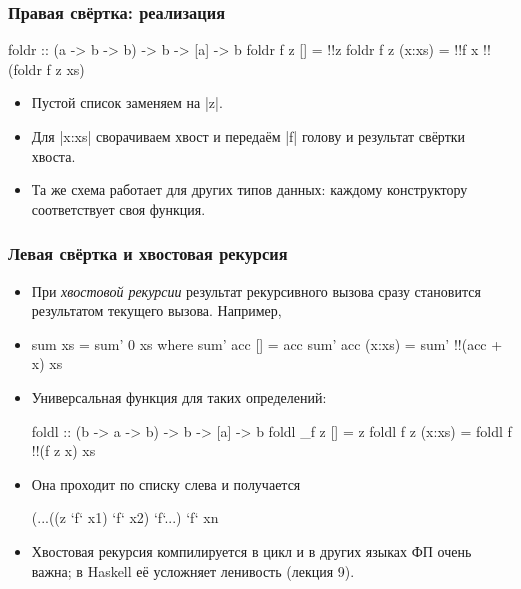\documentclass[11pt]{beamer}
\begin{document}
\begin{frame}[fragile]
  \frametitle{Правая свёртка: реализация}
  \begin{haskell}
    foldr :: (a -> b -> b) -> b -> [a] -> b
    foldr f z [] = !\pause!z
    foldr f z (x:xs) = !\pause!f x !\pause!(foldr f z xs)
  \end{haskell}
  \begin{itemize}
    \item Пустой список заменяем на \haskinline|z|.
    \item Для \haskinline|x:xs| сворачиваем хвост и передаём \haskinline|f| голову и результат свёртки хвоста.
    \item Та же схема работает для других типов данных: каждому конструктору соответствует своя функция.
  \end{itemize}
\end{frame}

\begin{frame}[fragile]
  \frametitle{Левая свёртка и хвостовая рекурсия}
  \begin{itemize}
    \item При \emph{хвостовой рекурсии} результат рекурсивного вызова сразу становится результатом текущего вызова. Например,
    \item \begin{haskellsmall}
            sum xs = sum' 0 xs where
              sum' acc [] = acc
              sum' acc (x:xs) = sum' !\pause!(acc + x) xs
          \end{haskellsmall}
    \item Универсальная функция для таких определений:
          \begin{haskellsmall}
            foldl :: (b -> a -> b) -> b -> [a] -> b
            foldl _f z [] = z
            foldl f z (x:xs) = foldl f !\pause!(f z x) xs
          \end{haskellsmall}
    \item Она проходит по списку слева и получается 
          \begin{haskellsmall}
            (...((z `f` x1) `f` x2) `f`...) `f` xn
          \end{haskellsmall}
    \item Хвостовая рекурсия компилируется в цикл и в других языках ФП очень важна; в Haskell её усложняет ленивость (лекция 9).
  \end{itemize}
\end{frame}
\end{document}
